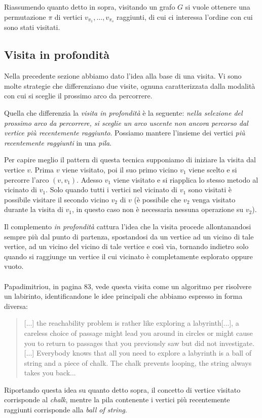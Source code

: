 Riassumendo quanto detto in sopra, visitando un grafo $G$ si vuole
ottenere una permutazione $\pi$ di vertici $v_{\pi_{1}}, \ldots,
v_{\pi_{s}}$ raggiunti, di cui ci interessa l'ordine con cui sono
stati visitati.

\subsection{Visita in profondit\`a}
Nella precedente sezione abbiamo dato l'idea alla base di una
visita. Vi sono molte strategie che differenziano due visite, ognuna
caratterizzata dalla modalit\`a con cui si sceglie il prossimo arco da
percorrere.

Quella che differenzia la \emph{visita in profondit\`a} \`e la
seguente: \emph{nella selezione del prossimo arco da percorrere, si
  sceglie un arco uscente non ancora percorso dal vertice pi\`u
  recentemente raggiunto}.  Possiamo mantere l'insieme dei vertici
\emph{pi\`u recentemente raggiunti} in una \emph{pila}.

Per capire meglio il pattern di questa tecnica supponiamo di iniziare
la visita dal vertice $v$. Prima $v$ viene visitato, poi il suo primo
vicino $v_{1}$ viene scelto e si percorre l'arco $(v, v_{1})$. Adesso
$v_{1}$ viene visitato e si riapplica lo stesso metodo al vicinato di
$v_{1}$. Solo quando tutti i vertici nel vicinato di $v_{1}$ sono
visitati \`e possibile visitare il secondo vicino $v_{2}$ di $v$ (\`e
possibile che $v_{2}$ venga visitato durante la visita di $v_{1}$, in
questo caso non \`e necessaria nessuna operazione su $v_{2}$).

Il complemento \emph{in profondit\`a} cattura l'idea che la visita
procede allontanandosi sempre pi\`u dal punto di partenza, spostandosi
da un vertice ad un vicino di tale vertice, ad un vicino del vicino di
tale vertice e cos\`i via, tornando indietro solo quando si raggiunge
un vertice il cui vicinato \`e completamente esplorato oppure vuoto.
\\\\
Papadimitriou, in \cite{Algorithms} pagina 83, vede questa visita come
un algoritmo per risolvere un labirinto, identificandone le idee
principali che abbiamo espresso in forma diversa:

\begin{quotation}
  [...] the reachability problem is rather like exploring a
  labyrinth[...], a careless choice of passage might lead you around
  in circles or might cause you to return to passages that you
  previously saw but did not investigate.[...] Everybody knows that
  all you need to explore a labyrinth is a ball of string and a piece
  of chalk. The chalk prevents looping, the string always takes you
  back...
\end{quotation}
Riportando questa idea su quanto detto sopra, il concetto di vertice
visitato corrisponde al \emph{chalk}, mentre la pila contenente i
vertici pi\`u recentemente raggiunti corrisponde alla \emph{ball of
  string}.

